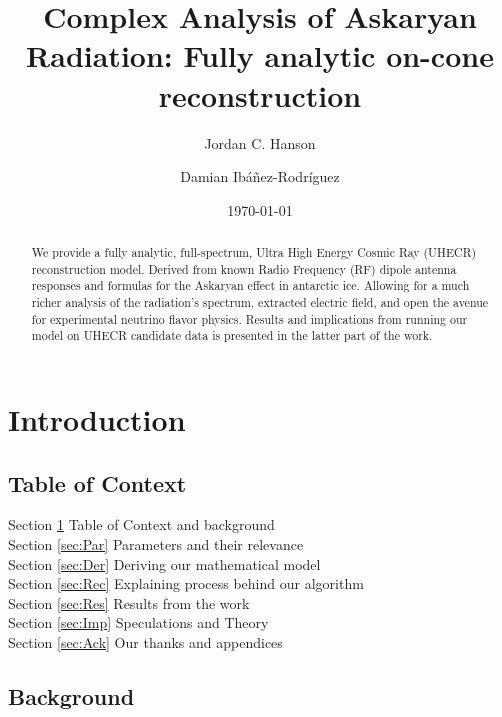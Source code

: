 \documentclass[amsmath,amssymb,aps,prd,10pt,twocolumn,showkeys]{revtex4}
\begin{document}
\title{Complex Analysis of Askaryan Radiation: Fully analytic on-cone reconstruction}
\author{Jordan C. Hanson}
\author{Damian Ibá\~{n}ez-Rodríguez}
\date{\today}

\begin{abstract}
We provide a fully analytic, full-spectrum, Ultra High Energy Cosmic Ray (UHECR) reconstruction model. Derived from known Radio Frequency (RF) dipole antenna responses and formulas for the Askaryan effect in antarctic ice. Allowing for a much richer analysis of the radiation's spectrum, extracted electric field, and open the avenue for experimental neutrino flavor physics. Results and implications from running our model on UHECR candidate data is presented in the latter part of the work.
\end{abstract}

    
\maketitle

\section{Introduction}
\label{sec:Int}

\subsection{Table of Context}
Section \ref{sec:Int} Table of Context and background  \\
Section \ref{sec:Par} Parameters and their relevance \\
Section \ref{sec:Der} Deriving our mathematical model \\
Section \ref{sec:Rec} Explaining process behind our algorithm \\ 
Section \ref{sec:Res} Results from the work \\ 
Section \ref{sec:Imp} Speculations and Theory \\
Section \ref{sec:Ack} Our thanks and appendices \\
\subsection{Background}
\end{document}
